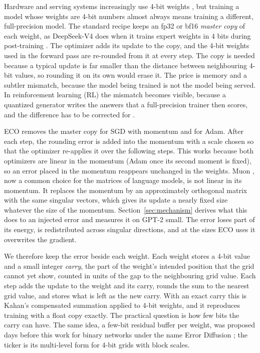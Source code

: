 \documentclass[11pt]{article}
\begin{document}
Hardware and serving systems increasingly use 4-bit weights \citep{nvidia2025nvfp4,rouhani2023mx}, but training a
model whose weights are 4-bit numbers almost always means training a different, full-precision model. The standard
recipe keeps an fp32 or bf16 \emph{master copy} of each weight, as DeepSeek-V4 does when it trains expert weights in
4 bits during post-training \citep{deepseek2026v4}. The optimizer adds its update to the copy, and the
4-bit weights used in the forward pass are re-rounded from it at every step. The copy is needed because a typical
update is far smaller than the distance between neighbouring 4-bit values, so rounding it on its own would erase it.
The price is memory and a subtler mismatch, because the model being trained is not the model being served. In reinforcement
learning (RL) the mismatch becomes visible, because a quantized generator writes the answers that a full-precision
trainer then scores, and the difference has to be corrected for \citep{yao2025offpolicy,liu2025flashrl}.

ECO \citep{nikdan2026eco} removes the master copy for SGD with momentum and for Adam. After each step, the rounding
error is added into the momentum with a scale chosen so that the optimizer re-applies it over the following steps.
This works because both optimizers are linear in the momentum (Adam once its second moment is fixed), so an error
placed in the momentum reappears unchanged in the weights. Muon \citep{jordan2024muon,liu2025moonlight}, now a common
choice for the matrices of language models, is not linear in its momentum. It replaces the momentum by an
approximately orthogonal matrix with the same singular vectors, which gives its update a nearly fixed size whatever
the size of the momentum. Section~\ref{sec:mechanism} derives what this does to an injected error and measures it on
GPT-2 small. The error loses part of its energy, is redistributed across singular directions, and at the sizes ECO
uses it overwrites the gradient.

We therefore keep the error beside each weight. Each weight stores a 4-bit value and a small integer \emph{carry},
the part of the weight's intended position that the grid cannot yet show, counted in units of the gap to the
neighbouring grid value. Each step adds the update to the weight and its carry, rounds the sum to the nearest grid
value, and stores what is left as the new carry. With an exact carry this is Kahan's compensated summation
\citep{kahan1965} applied to 4-bit weights, and it reproduces training with a float copy exactly. The practical
question is how few bits the carry can have. The same idea, a few-bit residual buffer per weight, was proposed days
before this work for binary networks under the name Error Diffusion \citep{bonin2026errordiffusion}; the ticker is its
multi-level form for 4-bit grids with block scales.
\end{document}
